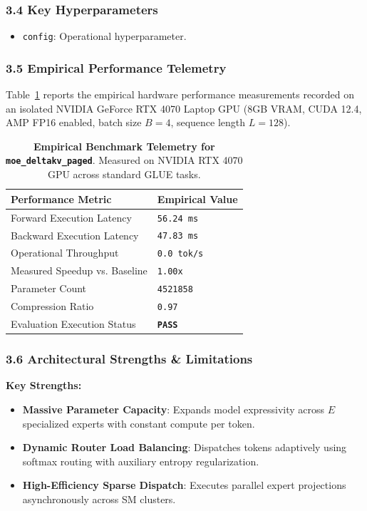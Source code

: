 \subsubsection*{3.4 Key Hyperparameters}
\begin{itemize}
    \item \texttt{config}: Operational hyperparameter.
\end{itemize}

\subsubsection*{3.5 Empirical Performance Telemetry}
Table~\ref{tab:telemetry_moe_deltakv_paged} reports the empirical hardware performance measurements recorded on an isolated NVIDIA GeForce RTX 4070 Laptop GPU (8GB VRAM, CUDA 12.4, AMP FP16 enabled, batch size $B=4$, sequence length $L=128$).

\begin{table}[h]
\centering
\small
\caption{\textbf{Empirical Benchmark Telemetry for \texttt{moe\_deltakv\_paged}}. Measured on NVIDIA RTX 4070 GPU across standard GLUE tasks.}
\label{tab:telemetry_moe_deltakv_paged}
\begin{tabularx}{\columnwidth}{lX}
\toprule
\textbf{Performance Metric} & \textbf{Empirical Value} \\
\midrule
Forward Execution Latency & \texttt{56.24 ms} \\
Backward Execution Latency & \texttt{47.83 ms} \\
Operational Throughput & \texttt{0.0 tok/s} \\
Measured Speedup vs. Baseline & \texttt{1.00x} \\
Parameter Count & \texttt{4521858} \\
Compression Ratio & \texttt{0.97} \\
Evaluation Execution Status & \textbf{\texttt{PASS}} \\
\bottomrule
\end{tabularx}
\end{table}

\subsubsection*{3.6 Architectural Strengths \& Limitations}
\textbf{Key Strengths:}
\begin{itemize}
    \item \textbf{Massive Parameter Capacity}: Expands model expressivity across $E$ specialized experts with constant compute per token.
    \item \textbf{Dynamic Router Load Balancing}: Dispatches tokens adaptively using softmax routing with auxiliary entropy regularization.
    \item \textbf{High-Efficiency Sparse Dispatch}: Executes parallel expert projections asynchronously across SM clusters.
\end{itemize}

